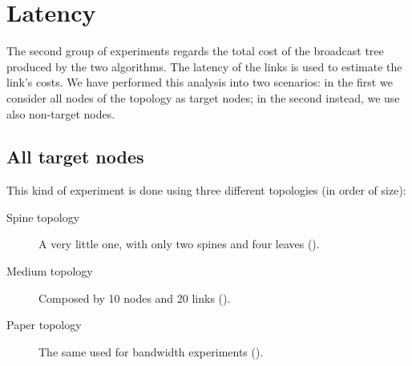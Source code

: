 \section{Latency}\label{sec:latency}

The second group of experiments regards the total cost of the broadcast tree
produced by the two algorithms. The latency of the links is used to estimate
the link's costs. We have performed this analysis into two scenarios: in the
first we consider all nodes of the topology as target nodes; in the second
instead, we use also non-target nodes.

\subsection{All target nodes}

This kind of experiment is done using three different topologies (in order of
size):
\begin{description}
	\item[Spine topology] A very little one, with only two spines and four
		leaves ().
	\item[Medium topology] Composed by 10 nodes and 20 links
		().
	\item [Paper topology] The same used for bandwidth experiments
		().
\end{description}

